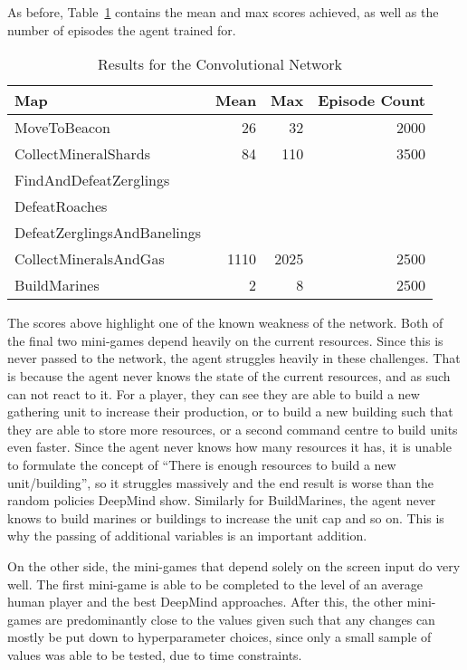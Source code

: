 As before, Table~\ref{tab:cnn_results} contains the mean and max
scores achieved, as well as the number of episodes the agent trained for.

\begin{table}[h]
    \centering
    \begin{tabular}{@{}lrrr@{}}
        \toprule
        Map                         & Mean & Max & Episode Count \\ \midrule
        MoveToBeacon                & 26 & 32 & 2000 \\
        CollectMineralShards        & 84 & 110 & 3500 \\
        FindAndDefeatZerglings      &      &     &               \\
        DefeatRoaches               &      &     &               \\
        DefeatZerglingsAndBanelings &      &     &               \\
        CollectMineralsAndGas       & 1110 & 2025 & 2500 \\
        BuildMarines                & 2 & 8 & 2500 \\ \bottomrule
    \end{tabular}
    \caption{Results for the Convolutional Network}%
    \label{tab:cnn_results}%
\end{table}

The scores above highlight one of the known weakness of the network. Both of the
final two mini-games depend heavily on the current resources. Since this is
never passed to the network, the agent struggles heavily in these challenges.
That is because the agent never knows the state of the current resources, and as
such can not react to it. For a player, they can see they are able to build a
new gathering unit to increase their production, or to build a new building such
that they are able to store more resources, or a second command centre to build
units even faster. Since the agent never knows how many resources it has, it is
unable to formulate the concept of ``There is enough resources to build a new
unit/building'', so it struggles massively and the end result is worse than the
random policies DeepMind show. Similarly for BuildMarines, the agent never knows
to build marines or buildings to increase the unit cap and so on. This is why
the passing of additional variables is an important addition.

On the other side, the mini-games that depend solely on the screen input do very
well. The first mini-game is able to be completed to the level of an average
human player and the best DeepMind approaches. After this, the other mini-games
are predominantly close to the values given such that any changes can mostly be
put down to hyperparameter choices, since only a small sample of values was able
to be tested, due to time constraints.


